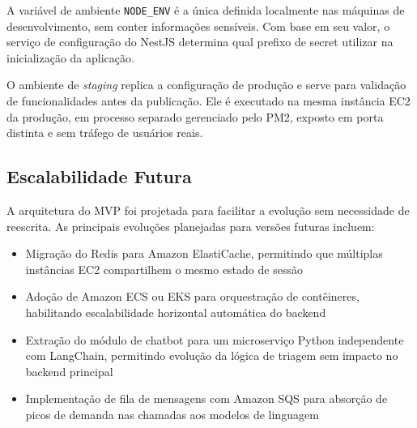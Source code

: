 A variável de ambiente \texttt{NODE\_ENV} é a
única definida localmente nas máquinas de
desenvolvimento, sem conter informações sensíveis.
Com base em seu valor, o serviço de configuração
do NestJS determina qual prefixo de secret utilizar
na inicialização da aplicação.

O ambiente de \textit{staging} replica a
configuração de produção e serve para validação
de funcionalidades antes da publicação. Ele é
executado na mesma instância EC2 da produção,
em processo separado gerenciado pelo PM2, exposto
em porta distinta e sem tráfego de usuários reais.

\subsection{Escalabilidade Futura}
\label{subsec:scalability}

A arquitetura do MVP foi projetada para facilitar
a evolução sem necessidade de reescrita. As
principais evoluções planejadas para versões
futuras incluem:

\begin{itemize}
  \item Migração do Redis para Amazon ElastiCache,
        permitindo que múltiplas instâncias EC2
        compartilhem o mesmo estado de sessão
  \item Adoção de Amazon ECS ou EKS para
        orquestração de contêineres, habilitando
        escalabilidade horizontal automática do
        backend
  \item Extração do módulo de chatbot para um
        microserviço Python independente com
        LangChain, permitindo evolução da lógica
        de triagem sem impacto no backend principal
  \item Implementação de fila de mensagens com
        Amazon SQS para absorção de picos de
        demanda nas chamadas aos modelos de
        linguagem
\end{itemize}